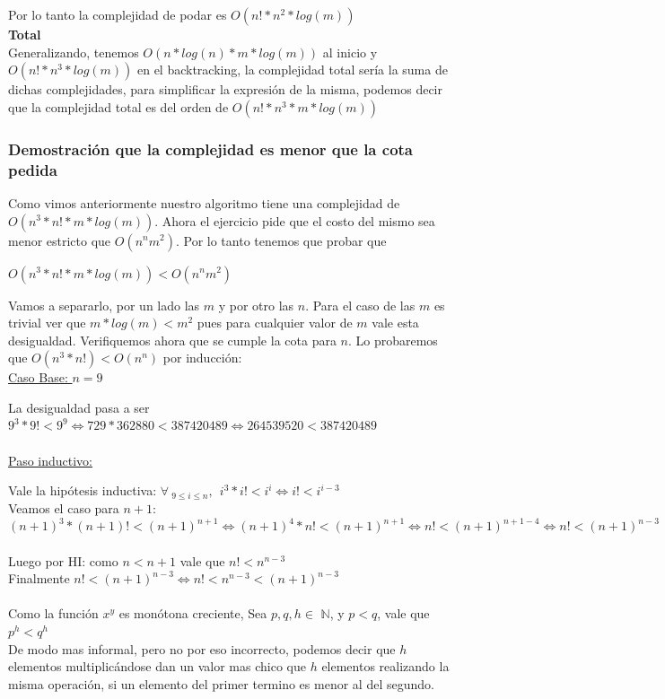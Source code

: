 \documentclass[a4paper, 10pt]{article}
\begin{document}
Por lo tanto la complejidad de podar es $O(n! * n^{2} * log (m))$\\

\textbf{Total}\\

Generalizando, tenemos $O(n * log (n) * m * log (m))$ al inicio y $O(n! * n^{3}  * log (m))$ en el backtracking, la complejidad total sería la suma de dichas complejidades, para simplificar la expresión de la misma, podemos decir que la complejidad total es del orden de $O(n! * n^{3}  * m * log (m))$\\


\subsubsection{Demostración que la complejidad es menor que la cota pedida}

Como vimos anteriormente nuestro algoritmo tiene una complejidad de $O(n^3*n!*m*log(m))$. Ahora el ejercicio pide que el costo del mismo sea menor estricto que $O(n^n m^2)$. Por lo tanto tenemos que probar que


\begin{center}
$O(n^3*n!*m*log(m)) < O(n^n m^2)$
\end{center}

Vamos a separarlo, por un lado las $m$ y por otro las $n$. Para el caso de las $m$ es trivial ver que $m * log(m) < m^2$ pues para cualquier valor de $m$ vale esta desigualdad.
Verifiquemos ahora que se cumple la cota para $n$. Lo probaremos que $O(n^3*n!) < O(n^n)$  por inducción:\\

\noindent \underline{Caso Base: $n = 9$}

La desigualdad pasa a ser $9^3*9! < 9^9 \Longleftrightarrow 729*362880 < 387420489 \Longleftrightarrow 264539520 < 387420489$\\
\\
\underline{Paso inductivo:}

Vale la hipótesis inductiva: $\forall\ _{9\leq i\leq n},\ \ i^3*i! < i^i \Longleftrightarrow i! < i^{i-3}$\\
Veamos el caso para $n+1$:\\
$(n+1)^3*(n+1)! < (n+1)^{n+1} \Longleftrightarrow (n+1)^4*n! < (n+1)^{n+1} \Longleftrightarrow n! < (n+1)^{n+1-4} \Longleftrightarrow n! < (n+1)^{n-3}$\\\\
Luego por HI: como $n < n+1$ vale que $n! < n^{n-3}$\\
Finalmente $n! < (n+1)^{n-3} \Longleftrightarrow n! < n^{n-3} < (n+1)^{n-3}$\\\\
Como la función $x^y$ es monótona creciente, Sea $p,q,h \in$ $\mathbb{N}$, y $p < q$, vale que $p^h < q^h$\\
De modo mas informal, pero no por eso incorrecto, podemos decir que $h$ elementos multiplicándose dan un valor mas chico que $h$ elementos realizando la misma operación, si un elemento del primer termino es menor al del segundo.
\end{document}
